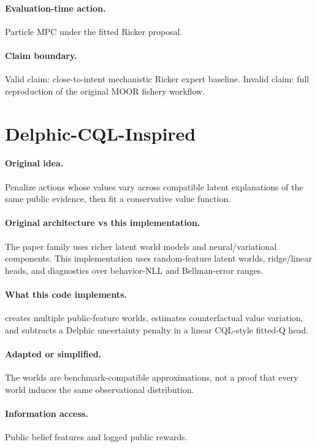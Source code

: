 \documentclass[11pt]{article}
\begin{document}
\paragraph{Evaluation-time action.}
Particle MPC under the fitted Ricker proposal.

\paragraph{Claim boundary.}
Valid claim: close-to-intent mechanistic Ricker expert baseline. Invalid claim:
full reproduction of the original MOOR fishery workflow.

\section{Delphic-CQL-Inspired}

\paragraph{Original idea.}
Penalize actions whose values vary across compatible latent explanations of the
same public evidence, then fit a conservative value function.

\paragraph{Original architecture vs this implementation.}
The paper family uses richer latent world models and neural/variational
components. This implementation uses random-feature latent worlds, ridge/linear
heads, and diagnostics over behavior-NLL and Bellman-error ranges.

\paragraph{What this code implements.}
 creates multiple public-feature worlds, estimates
counterfactual value variation, and subtracts a Delphic uncertainty penalty in a
linear CQL-style fitted-Q head.

\paragraph{Adapted or simplified.}
The worlds are benchmark-compatible approximations, not a proof that every
world induces the same observational distribution.

\paragraph{Information access.}
Public belief features and logged public rewards.
\end{document}
